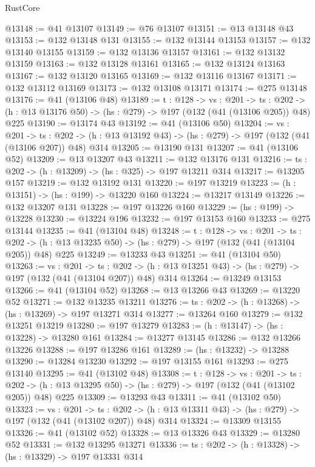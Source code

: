 \begin{lexlean}{RustCore}
\begin{coremodule}
@13148 := @41 @13107
@13149 := @76 @13107
@13151 := @13 @13148 @43
@13153 := @132 @13148 @131
@13155 := @132 @13144 @13153
@13157 := @132 @13140 @13155
@13159 := @132 @13136 @13157
@13161 := @132 @13132 @13159
@13163 := @132 @13128 @13161
@13165 := @132 @13124 @13163
@13167 := @132 @13120 @13165
@13169 := @132 @13116 @13167
@13171 := @132 @13112 @13169
@13173 := @132 @13108 @13171
@13174 := @275 @13148
@13176 := @41 (@13106 @48)
@13189 := {t : @128} ->
  {vs : @201} ->
  {ts : @202} -> (h : @13 @13176 @50) -> (hs : @279) -> @197 (@132 (@41 (@13106 @205)) @48) @225
@13190 := @13174 @43
@13192 := @41 (@13106 @50)
@13204 := {vs : @201} ->
  {ts : @202} -> (h : @13 @13192 @43) -> (hs : @279) -> @197 (@132 (@41 (@13106 @207)) @48) @314
@13205 := @13190 @131
@13207 := @41 (@13106 @52)
@13209 := @13 @13207 @43
@13211 := @132 @13176 @131
@13216 := {ts : @202} -> (h : @13209) -> (hs : @325) -> @197 @13211 @314
@13217 := @13205 @157
@13219 := @132 @13192 @131
@13220 := @197 @13219
@13223 := (h : @13151) -> (hs : @199) -> @13220 @160
@13224 := @13217 @13149
@13226 := @132 @13207 @131
@13228 := @197 @13226 @160
@13229 := (hs : @199) -> @13228
@13230 := @13224 @196
@13232 := @197 @13153 @160
@13233 := @275 @13144
@13235 := @41 (@13104 @48)
@13248 := {t : @128} ->
  {vs : @201} ->
  {ts : @202} -> (h : @13 @13235 @50) -> (hs : @279) -> @197 (@132 (@41 (@13104 @205)) @48) @225
@13249 := @13233 @43
@13251 := @41 (@13104 @50)
@13263 := {vs : @201} ->
  {ts : @202} -> (h : @13 @13251 @43) -> (hs : @279) -> @197 (@132 (@41 (@13104 @207)) @48) @314
@13264 := @13249 @13153
@13266 := @41 (@13104 @52)
@13268 := @13 @13266 @43
@13269 := @13220 @52
@13271 := @132 @13235 @13211
@13276 := {ts : @202} -> (h : @13268) -> (hs : @13269) -> @197 @13271 @314
@13277 := @13264 @160
@13279 := @132 @13251 @13219
@13280 := @197 @13279
@13283 := (h : @13147) -> (hs : @13228) -> @13280 @161
@13284 := @13277 @13145
@13286 := @132 @13266 @13226
@13288 := @197 @13286 @161
@13289 := (hs : @13232) -> @13288
@13290 := @13284 @13230
@13292 := @197 @13155 @161
@13293 := @275 @13140
@13295 := @41 (@13102 @48)
@13308 := {t : @128} ->
  {vs : @201} ->
  {ts : @202} -> (h : @13 @13295 @50) -> (hs : @279) -> @197 (@132 (@41 (@13102 @205)) @48) @225
@13309 := @13293 @43
@13311 := @41 (@13102 @50)
@13323 := {vs : @201} ->
  {ts : @202} -> (h : @13 @13311 @43) -> (hs : @279) -> @197 (@132 (@41 (@13102 @207)) @48) @314
@13324 := @13309 @13155
@13326 := @41 (@13102 @52)
@13328 := @13 @13326 @43
@13329 := @13280 @52
@13331 := @132 @13295 @13271
@13336 := {ts : @202} -> (h : @13328) -> (hs : @13329) -> @197 @13331 @314

\end{coremodule}
\end{lexlean}
